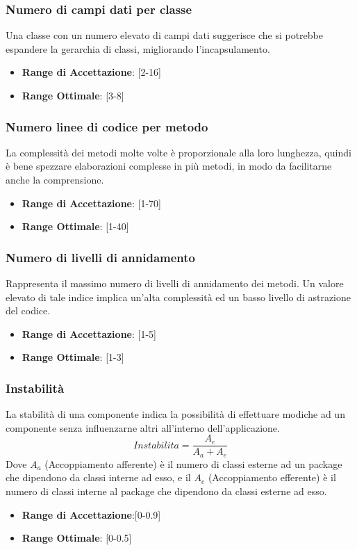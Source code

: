 \documentclass[12pt,a4paper]{article}
\begin{document}
\subsubsection{Numero di campi dati per classe}
Una classe con un numero elevato di campi dati suggerisce che si potrebbe espandere la gerarchia di classi, migliorando l'incapsulamento.
\begin{itemize}
\item \textbf{Range di Accettazione}: [2-16]
\item \textbf{Range Ottimale}: [3-8]
\end{itemize}
\subsubsection{Numero linee di codice per metodo}
La complessità dei metodi molte volte è proporzionale alla loro lunghezza,
quindi è bene spezzare elaborazioni complesse in più metodi, in modo da facilitarne anche la comprensione.
\begin{itemize}
\item \textbf{Range di Accettazione}: [1-70]
\item \textbf{Range Ottimale}: [1-40]
\end{itemize}
\subsubsection{Numero di livelli di annidamento}
Rappresenta il massimo numero di livelli di annidamento dei metodi. Un valore elevato di tale indice implica un’alta complessità ed un basso livello di astrazione del codice.
\begin{itemize}
\item \textbf{Range di Accettazione}: [1-5]
\item \textbf{Range Ottimale}: [1-3]
\end{itemize}
\subsubsection{Instabilità}
La stabilità di una componente indica la possibilità di effettuare modiche ad un componente senza influenzarne altri all’interno dell'applicazione.
\[Instabilita=\frac{A_e}{A_a+A_e}\]
Dove $A_a$ (Accoppiamento afferente) è il numero di classi esterne ad un package che dipendono da classi interne ad esso, e il $A_e$ (Accoppiamento efferente) è il numero di classi interne al package che dipendono da classi esterne ad esso.
\begin{itemize}
\item \textbf{Range di Accettazione}:[0-0.9]
\item \textbf{Range Ottimale}: [0-0.5]
\end{itemize}
\end{document}
